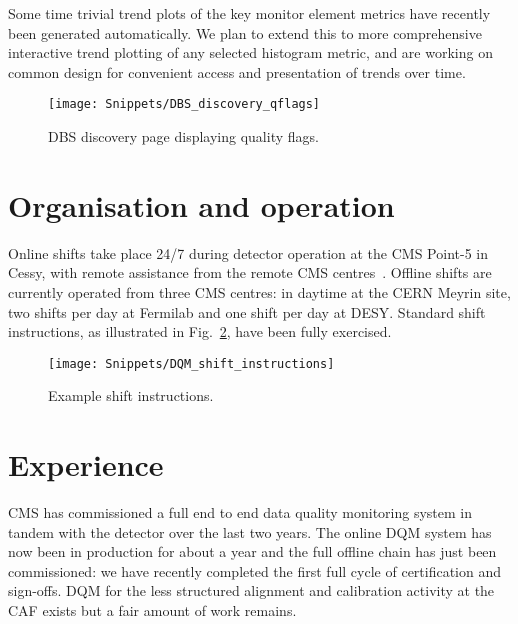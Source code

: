 \documentclass[a4paper]{jpconf}
\begin{document}
Some time trivial trend plots of the key monitor element metrics have recently
been generated automatically.  We plan to extend this to more comprehensive
interactive trend plotting of any selected histogram metric, and are working
on common design for convenient access and presentation of trends over time.

\begin{figure}[!tbp]
\begin{center}
\texttt{[image: Snippets/DBS\_discovery\_qflags]}
\caption{\label{fig:dbsqflags}DBS discovery page displaying quality flags.}
\end{center}
\end{figure}


\section{Organisation and operation}

Online shifts take place 24/7 during detector operation at the CMS Point-5 in
Cessy, with remote assistance from the remote CMS
centres~\cite{cms_centres_09,collaboration_at_distance_09}.  Offline shifts
are currently operated from three CMS centres: in daytime at the CERN Meyrin
site, two shifts per day at Fermilab and one shift per day at DESY.  Standard
shift instructions, as illustrated in Fig.~\ref{fig:shiftdoc}, have been
fully exercised.

\begin{figure}[!tbp]
\begin{center}
\texttt{[image: Snippets/DQM\_shift\_instructions]}
\caption{\label{fig:shiftdoc}Example shift instructions.}
\end{center}
\end{figure}


\section{Experience}

CMS has commissioned a full end to end data quality monitoring system in
tandem with the detector over the last two years.  The online DQM system has
now been in production for about a year and the full offline chain has just
been commissioned: we have recently completed the first full cycle of
certification and sign-offs.  DQM for the less structured alignment and
calibration activity at the CAF exists but a fair amount of work remains.
\end{document}
